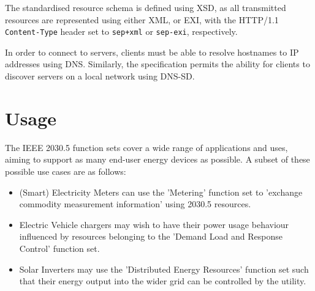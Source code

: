 The standardised resource schema is defined using XSD, as all transmitted resources are represented using either XML, or EXI, with the HTTP/1.1 \texttt{Content-Type} header set to \texttt{sep+xml} or \texttt{sep-exi}, respectively.

In order to connect to servers, clients must be able to resolve hostnames to IP addresses using DNS. Similarly, the specification permits the ability for clients to discover servers on a local network using DNS-SD.

\section{Usage}
The IEEE 2030.5 function sets cover a wide range of applications and uses, aiming to support as many end-user energy devices as possible. A subset of these possible use cases are as follows:
\begin{itemize}
    \item (Smart) Electricity Meters can use the 'Metering' function set to 'exchange commodity measurement information' using 2030.5 resources. \cite{IEEE2030.5}
    \item Electric Vehicle chargers may wish to have their power usage behaviour influenced by resources belonging to the 'Demand Load and Response Control' function set.
    \item Solar Inverters may use the 'Distributed Energy Resources' function set such that their energy output into the wider grid can be controlled by the utility.
\end{itemize}
